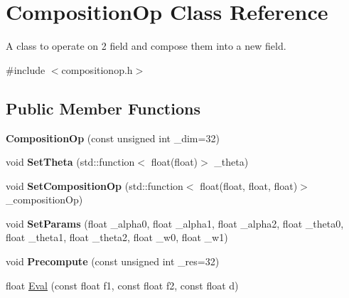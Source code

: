 \hypertarget{classCompositionOp}{}\section{Composition\+Op Class Reference}
\label{classCompositionOp}


A class to operate on 2 field and compose them into a new field.  




{\ttfamily \#include $<$compositionop.\+h$>$}

\subsection*{Public Member Functions}
\begin{DoxyCompactItemize}
\item 
{\bfseries Composition\+Op} (const unsigned int \+\_\+dim=32)\hypertarget{classCompositionOp_aca1238b25d6ab1453a3811daa017aa82}{}\label{classCompositionOp_aca1238b25d6ab1453a3811daa017aa82}

\item 
void {\bfseries Set\+Theta} (std\+::function$<$ float(float)$>$ \+\_\+theta)\hypertarget{classCompositionOp_ad02524aa790a6c765434ab45c30c8cc7}{}\label{classCompositionOp_ad02524aa790a6c765434ab45c30c8cc7}

\item 
void {\bfseries Set\+Composition\+Op} (std\+::function$<$ float(float, float, float)$>$ \+\_\+composition\+Op)\hypertarget{classCompositionOp_a01f25ef36a6118e8a55216a9d5db78cc}{}\label{classCompositionOp_a01f25ef36a6118e8a55216a9d5db78cc}

\item 
void {\bfseries Set\+Params} (float \+\_\+alpha0, float \+\_\+alpha1, float \+\_\+alpha2, float \+\_\+theta0, float \+\_\+theta1, float \+\_\+theta2, float \+\_\+w0, float \+\_\+w1)\hypertarget{classCompositionOp_acbc3386cd2afc194dcc621f47fca666d}{}\label{classCompositionOp_acbc3386cd2afc194dcc621f47fca666d}

\item 
void {\bfseries Precompute} (const unsigned int \+\_\+res=32)\hypertarget{classCompositionOp_aa80f5d11ae31e1f6863ad444d1f090e2}{}\label{classCompositionOp_aa80f5d11ae31e1f6863ad444d1f090e2}

\item 
float \hyperlink{classCompositionOp_a57732ab8935cfe1be82db7185feb5ae9}{Eval} (const float f1, const float f2, const float d)\hypertarget{classCompositionOp_a57732ab8935cfe1be82db7185feb5ae9}{}\label{classCompositionOp_a57732ab8935cfe1be82db7185feb5ae9}


\end{DoxyCompactItemize}
